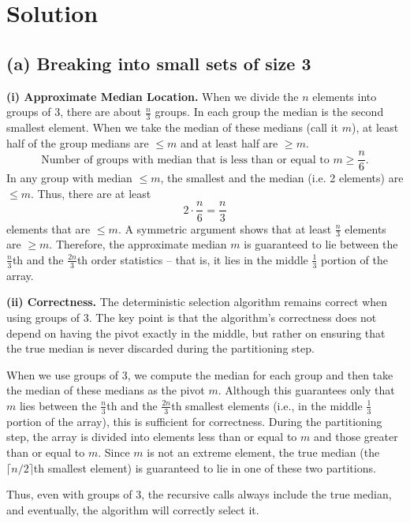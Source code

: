 \documentclass[11pt]{article}
\begin{document}
    \section*{Solution}    
    \subsection*{(a) Breaking into small sets of size 3}
    
    \textbf{(i) Approximate Median Location.}  
    When we divide the \(n\) elements into groups of 3, there are about \(\frac{n}{3}\) groups. In each group the median is the second smallest element. When we take the median of these medians (call it \(m\)), at least half of the group medians are \(\le m\) and at least half are \(\ge m\).  
    \[
    \text{Number of groups with median that is less than or equal to } m \ge \frac{n}{6}.
    \]
    In any group with median \(\le m\), the smallest and the median (i.e. 2 elements) are \(\le m\). Thus, there are at least 
    \[
    2\cdot\frac{n}{6} = \frac{n}{3}
    \]
    elements that are \(\le m\). A symmetric argument shows that at least \(\frac{n}{3}\) elements are \(\ge m\). Therefore, the approximate median \(m\) is guaranteed to lie between the \(\frac{n}{3}\)th and the \(\frac{2n}{3}\)th order statistics – that is, it lies in the middle \(\frac{1}{3}\) portion of the array.
    \medskip
    
    \textbf{(ii) Correctness.}  
    The deterministic selection algorithm remains correct when using groups of 3. The key point is that the algorithm’s correctness does not depend on having the pivot exactly in the middle, but rather on ensuring that the true median is never discarded during the partitioning step. 

    When we use groups of 3, we compute the median for each group and then take the median of these medians as the pivot \(m\). Although this guarantees only that \(m\) lies between the \(\frac{n}{3}\)th and the \(\frac{2n}{3}\)th smallest elements (i.e., in the middle \(\frac{1}{3}\) portion of the array), this is sufficient for correctness. During the partitioning step, the array is divided into elements less than or equal to \(m\) and those greater than or equal to \(m\). Since \(m\) is not an extreme element, the true median (the \(\lceil n/2 \rceil\)th smallest element) is guaranteed to lie in one of these two partitions. 
    
    Thus, even with groups of 3, the recursive calls always include the true median, and eventually, the algorithm will correctly select it.
    \medskip
    
\end{document}
